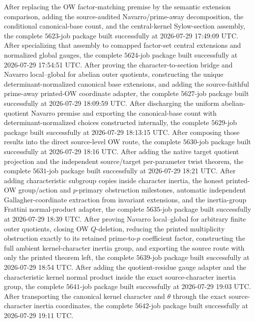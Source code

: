 \documentclass[11pt]{article}
\begin{document}
After replacing the OW factor-matching premise by the semantic extension
comparison, adding the source-audited Navarro/prime-away decomposition, the
conditional canonical-base count, and the central-kernel Sylow-section
assembly, the complete \(5623\)-job package built successfully at
2026-07-29 17:49:09 UTC.
After specializing that assembly to comapped factor-set central
extensions and normalized global gauges, the complete \(5624\)-job
package built successfully at 2026-07-29 17:54:51 UTC.
After proving the character-to-section bridge and Navarro local--global
for abelian outer quotients, constructing the unique
determinant-normalized canonical base extensions, and adding the
source-faithful prime-away printed-OW coordinate adapter, the complete
\(5627\)-job package built successfully at 2026-07-29 18:09:59 UTC.
After discharging the uniform abelian-quotient Navarro premise and
exporting the canonical-base count with determinant-normalized choices
constructed internally, the complete \(5629\)-job package built
successfully at 2026-07-29 18:13:15 UTC.
After composing those results into the direct source-level OW route, the
complete \(5630\)-job package built successfully at
2026-07-29 18:16 UTC.
After adding the native target quotient projection and the independent
source/target per-parameter twist theorem, the complete \(5631\)-job
package built successfully at 2026-07-29 18:21 UTC.
After adding characteristic subgroup copies inside character inertia,
the honest printed-OW group/action and \(p\)-primary obstruction
milestones, automatic independent Gallagher-coordinate extraction from
invariant extensions, and the inertia-group Frattini normal-product
adapter, the complete \(5635\)-job package built successfully at
2026-07-29 18:39 UTC.
After proving Navarro local--global for arbitrary finite outer quotients,
closing OW \(Q\)-deletion, reducing the printed multiplicity obstruction
exactly to its retained prime-to-\(p\) coefficient factor, constructing
the full ambient kernel-character inertia group, and exporting the
source route with only the printed theorem left, the complete
\(5639\)-job package built successfully at 2026-07-29 18:54 UTC.
After adding the quotient-residue gauge adapter and the characteristic
kernel normal product inside the exact source-character inertia group, the
complete \(5641\)-job package built successfully at 2026-07-29 19:03 UTC.
After transporting the canonical kernel character and \(\theta\) through
the exact source-character inertia coordinates, the complete
\(5642\)-job package built successfully at 2026-07-29 19:11 UTC.
\end{document}
